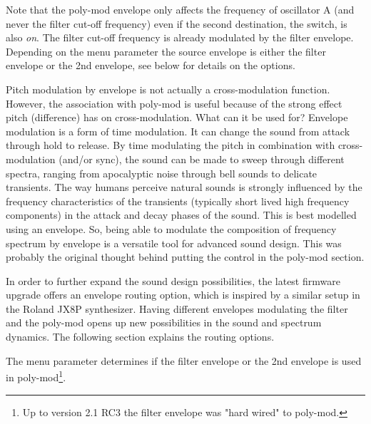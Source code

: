 Note that the poly-mod envelope only affects the frequency of oscillator A (and never the filter cut-off frequency) even if the second destination, the \polymodfilter switch, is also \textit{on}. The filter cut-off frequency is already modulated by the filter envelope. Depending on the menu parameter \envrouting the source envelope is either the filter envelope or the 2nd envelope, see below for details on the options.

Pitch modulation by envelope is not actually a cross-modulation function. However, the association with poly-mod is useful because of the strong effect pitch (difference) has on cross-modulation. What can it be used for? Envelope modulation is a form of time modulation. It can change the sound from attack through hold to release. By time modulating the pitch in combination with cross-modulation (and/or sync), the sound can be made to sweep through different spectra, ranging from apocalyptic noise through bell sounds to delicate transients. The way humans perceive natural sounds is strongly influenced by the frequency characteristics of the transients (typically short lived high frequency components) in the attack and decay phases of the sound. This is best modelled using an envelope. So, being able to modulate the composition of frequency spectrum by envelope is a versatile tool for advanced sound design. This was probably the original thought behind putting the \polymodenv control in the poly-mod section.

In order to further expand the sound design possibilities, the latest firmware upgrade offers an envelope routing option, which is inspired by a similar setup in the Roland JX8P synthesizer. Having different envelopes modulating the filter and the poly-mod opens up new possibilities in the sound and spectrum dynamics. The following section explains the routing options. 

The menu parameter \envrouting determines if the filter envelope or the 2nd envelope is used in poly-mod\footnote{Up to version 2.1 RC3 the filter envelope was "hard wired" to poly-mod.}.

